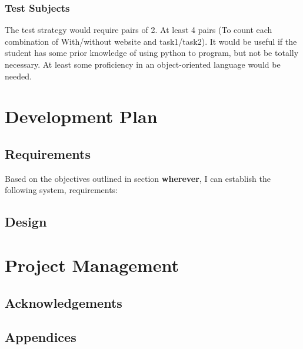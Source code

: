 \documentclass[a4paper,11pt]{report}
\begin{document}
\subsection{Test Subjects}
The test strategy would require pairs of 2. At least 4 pairs (To count each combination of With/without website and task1/task2). It would be useful if the student has some prior knowledge of using python to program, but not be totally necessary. At least some proficiency in an object-oriented language would be needed.

\chapter{Development Plan}

\section{Requirements}
Based on the objectives outlined in section \textbf{wherever}, I can establish the following system, requirements:

\section{Design}


\chapter{Project Management}

{}


\section*{Acknowledgements}

\section*{Appendices}
\end{document}
